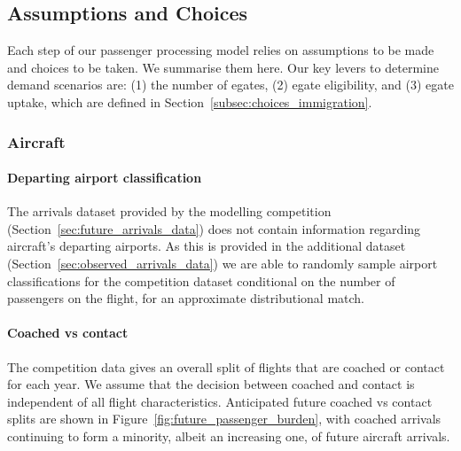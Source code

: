 \documentclass[10pt]{article}
\begin{document}
\subsection{Assumptions and Choices}
Each step of our passenger processing model relies on assumptions to be made and choices to be taken. We summarise them here. Our key levers to determine demand scenarios are: (1) the number of \glspl{egate}, (2) \gls{egate} eligibility, and (3) \gls{egate} uptake, which are defined in Section~\ref{subsec:choices_immigration}.

\subsubsection{Aircraft}

\paragraph{Departing airport classification}
The arrivals dataset provided by the modelling competition (Section~\ref{sec:future_arrivals_data}) does not contain information regarding aircraft's departing airports. As this is provided in the additional dataset (Section~\ref{sec:observed_arrivals_data}) we are able to randomly sample airport classifications for the competition dataset conditional on the number of passengers on the flight, for an approximate distributional match. 




\paragraph{Coached vs contact}
The competition data gives an overall split of flights that are coached or contact for each year. We assume that the decision between coached and contact is independent of all flight characteristics. Anticipated future coached vs contact splits are shown in Figure~\ref{fig:future_passenger_burden}, with coached arrivals continuing to form a minority, albeit an increasing one, of future aircraft arrivals.
\end{document}
